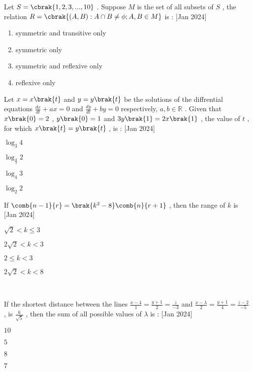\item Let $S=\cbrak{1,2,3,...,10}$  . Suppose $ M $ is the set of all subsets of $ S $ , the relation $R=\cbrak{ (A,B):A \cap B \neq \phi ;A,B \in M }$ is : \hfill{[Jan 2024]}
\begin{enumerate}
\item symmetric and transitive only 
\item symmetric only 
\item symmetric and reflexive only 
\item reflexive only 
\end{enumerate}
\item Let $x=x\brak{t}$ and $y=y\brak{t}$ be the solutions of the diffrential equations $\frac{dx}{dt}+ax=0$ and $\frac{dy}{dt}+by=0$ respectively, $a,b \in \mathbb{R}$ . Given that $x\brak{0}=2$ , $y\brak{0}=1$ and $3y\brak{1}=2x\brak{1}$ , the value of $t$ , for which $x\brak{t}=y\brak{t}$ , is :  \hfill{[Jan 2024]}
\begin{enumerate}   
\begin{multicols}{2}
\item $ \log_3 4 $
\item $ \log_{\frac{4}{3}} 2 $
\item $ \log_4 3 $
\item $ \log_2 2 $
\end{multicols}
\end{enumerate}
\item If $\comb{n-1}{r} = \brak{k^2 - 8}\comb{n}{r+1}$ , then the range of $k$ is \hfill{[Jan 2024]}
\begin{enumerate}
\begin{multicols}{2}
\item $ \sqrt{2}<k \leq 3 $
\item $ 2\sqrt{2}<k<3 $
\item $ 2 \leq k<3 $
\item $ 2\sqrt{2}<k<8 $
\end{multicols}
\end{enumerate} \\
\item If the shortest distance between the lines $ \frac{x-4}{1}=\frac{y+1}{2}=\frac{z}{-3} $ and $ \frac{x-\lambda}{2}=\frac{y+1}{4}=\frac{z-2}{-5} $ , is $\frac{6}{\sqrt{5}}$ , then the sum of all possible values of $\lambda$ is : \hfill{[Jan 2024]}
\begin{enumerate}   
\begin{multicols}{4}
\item $10$
\item $5$
\item $8$
\item $7$                                                                        
\end{multicols}
\end{enumerate}
